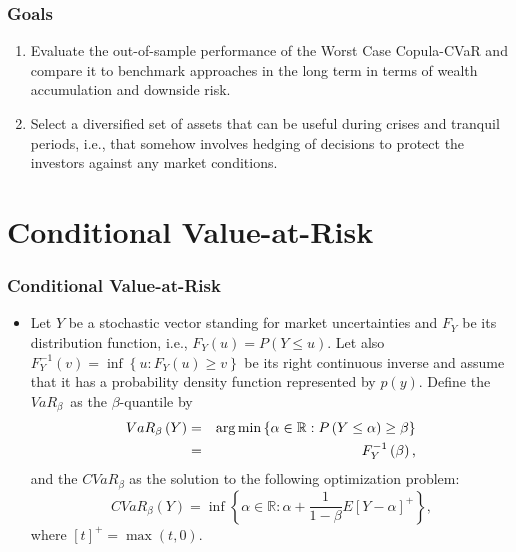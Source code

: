 \documentclass[pdf,10pt,xcolor=dvipsnames,hide notes]{beamer}
\begin{document}
\begin{frame}[label=frame2]
\frametitle{Goals}

\begin{enumerate}[(1)]
\justifying

\item Evaluate the out-of-sample performance of the Worst Case Copula-CVaR and compare it to benchmark approaches in the long term in terms of wealth accumulation and
downside risk.

\vspace{0.3cm}

\item Select a diversified set of assets that can be
useful during crises and tranquil periods, i.e., that somehow involves hedging of decisions
to protect the investors against any market conditions.

\end{enumerate}

\end{frame}

\section{Conditional Value-at-Risk}
\begin{frame}[label=frame2b2]
	\frametitle{Conditional Value-at-Risk}
	\begin{itemize}
		\justifying
		
		\item 	Let $Y$ be a stochastic vector standing for market uncertainties and $F_{Y}$
		be its distribution function, i.e., $F_{Y}\left( u\right) =P\left( Y\leq
		u\right) $. Let also $F_{Y}^{-1}\left( v\right) =\inf \left\{ u:F_{Y}\left(
		u\right) \geq v\right\} $ be its right continuous inverse and assume that it
		has a probability density function represented by $p(y)$. Define the $VaR_{\beta
		}$\thinspace\ as the $\beta $-quantile by
		\begin{eqnarray}
		VaR_{\beta }\left( Y\right) &=& \arg \min \left\{ \alpha \in
		\mathbb{R}
		:P\left( Y\leq \alpha \right) \geq \beta \right\}  \label{one} \\
		&=&F_{Y}^{-1}\left( \beta \right) \text{,}  \notag
		\end{eqnarray}%
		and the $CVaR_{\beta }$ as the solution to the following optimization
		problem:
		\begin{equation}
		CVaR_{\beta }\left( Y\right) =\inf \left\{ \alpha \in
		\mathbb{R}
		:\alpha +\frac{1}{1-\beta }E\left[ Y-\alpha \right] ^{+}\right\} \text{,}
		\label{two}
		\end{equation}%
		where $\left[ t\right] ^{+}=\max \left( t,0\right) $.
		
	\end{itemize}
	
\end{frame}
\end{document}
